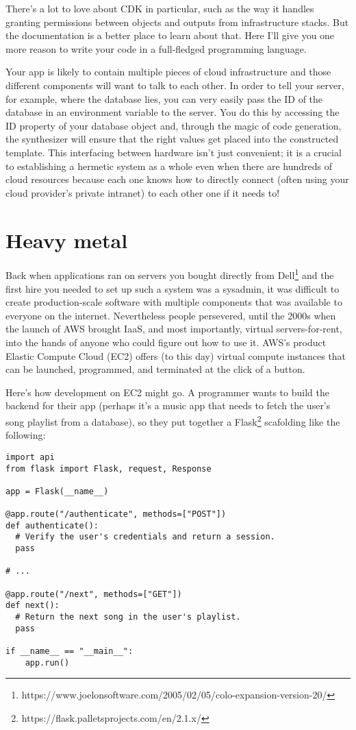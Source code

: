 \documentclass{article}
\begin{document}
There's a lot to love about CDK in particular, such as the way it handles granting permissions between objects and outputs from infrastructure stacks.
But the documentation is a better place to learn about that.
Here I'll give you one more reason to write your code in a full-fledged programming language.

Your app is likely to contain multiple pieces of cloud infrastructure and those different components will want to talk to each other.
In order to tell your server, for example, where the database lies, you can very easily pass the ID of the database in an environment variable to the server.
You do this by accessing the ID property of your database object and, through the magic of code generation, the synthesizer will ensure that the right values get placed into the constructed template.
This interfacing between hardware isn't just convenient; it is a crucial to establishing a hermetic system as a whole even when there are hundreds of cloud resources because each one knows how to directly connect (often using your cloud provider's private intranet) to each other one if it needs to!

\section{Heavy metal}

Back when applications ran on servers you bought directly from Dell\footnote{https://www.joelonsoftware.com/2005/02/05/colo-expansion-version-20/} and the first hire you needed to set up such a system was a sysadmin, it was difficult to create production-scale software with multiple components that was available to everyone on the internet.
Nevertheless people persevered, until the 2000s when the launch of AWS brought IaaS, and most importantly, virtual servers-for-rent, into the hands of anyone who could figure out how to use it.
AWS's product Elastic Compute Cloud (EC2) offers (to this day) virtual compute instances that can be launched, programmed, and terminated at the click of a button.

Here's how development on EC2 might go.
A programmer wants to build the backend for their app (perhaps it's a music app that needs to fetch the user's song playlist from a database), so they put together a Flask\footnote{https://flask.palletsprojects.com/en/2.1.x/} scafolding like the following:

\begin{verbatim}
import api
from flask import Flask, request, Response

app = Flask(__name__)

@app.route("/authenticate", methods=["POST"])
def authenticate():
  # Verify the user's credentials and return a session.
  pass

# ...

@app.route("/next", methods=["GET"])
def next():
  # Return the next song in the user's playlist.
  pass

if __name__ == "__main__":
    app.run()
\end{verbatim}
\end{document}
